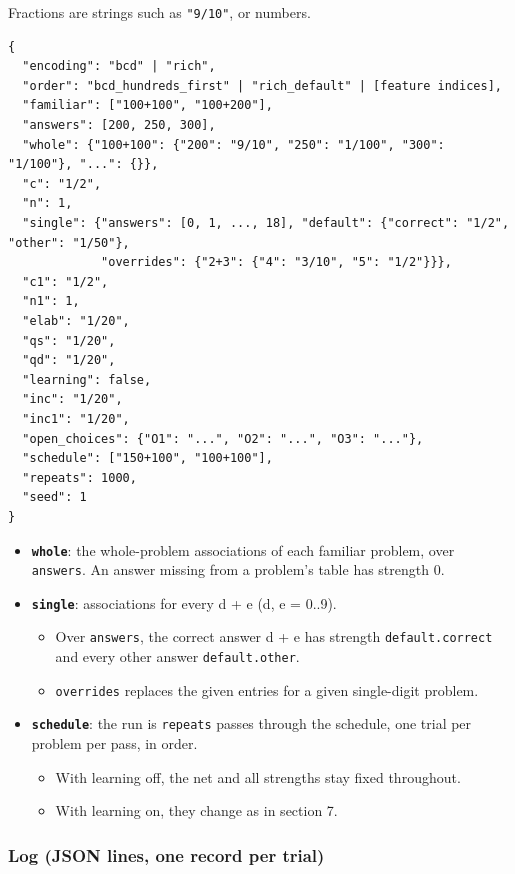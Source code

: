 Fractions are strings such as \texttt{"9/10"}, or numbers.

\begin{Verbatim}[breaklines,breakanywhere,fontsize=\footnotesize]
{
  "encoding": "bcd" | "rich",
  "order": "bcd_hundreds_first" | "rich_default" | [feature indices],
  "familiar": ["100+100", "100+200"],
  "answers": [200, 250, 300],
  "whole": {"100+100": {"200": "9/10", "250": "1/100", "300": "1/100"}, "...": {}},
  "c": "1/2",
  "n": 1,
  "single": {"answers": [0, 1, ..., 18], "default": {"correct": "1/2", "other": "1/50"},
             "overrides": {"2+3": {"4": "3/10", "5": "1/2"}}},
  "c1": "1/2",
  "n1": 1,
  "elab": "1/20",
  "qs": "1/20",
  "qd": "1/20",
  "learning": false,
  "inc": "1/20",
  "inc1": "1/20",
  "open_choices": {"O1": "...", "O2": "...", "O3": "..."},
  "schedule": ["150+100", "100+100"],
  "repeats": 1000,
  "seed": 1
}
\end{Verbatim}

\begin{itemize}
\tightlist
\item
  \textbf{\texttt{whole}}: the whole-problem associations of each familiar problem, over \texttt{answers}. An answer missing from a problem's table has strength 0.
\item
  \textbf{\texttt{single}}: associations for every d + e (d, e = 0..9).

  \begin{itemize}
  \tightlist
  \item
    Over \texttt{answers}, the correct answer d + e has strength \texttt{default.correct} and every other answer \texttt{default.other}.
  \item
    \texttt{overrides} replaces the given entries for a given single-digit problem.
  \end{itemize}
\item
  \textbf{\texttt{schedule}}: the run is \texttt{repeats} passes through the schedule, one trial per problem per pass, in order.

  \begin{itemize}
  \tightlist
  \item
    With learning off, the net and all strengths stay fixed throughout.
  \item
    With learning on, they change as in section 7.
  \end{itemize}
\end{itemize}

\subsubsection{Log (JSON lines, one record per trial)}\label{log-json-lines-one-record-per-trial}

